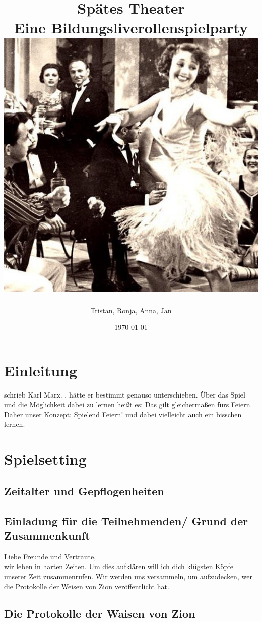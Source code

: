 \documentclass[12pt, a4paper, openany]{report}
\title{
  {\textbf{Spätes Theater}}\\
  {\large{Eine Bildungsliverollenspielparty}}\\
  \bigskip
  \bigskip
  \includegraphics[scale=0.5]{titelbild.jpg}
}
\author{Tristan, Ronja, Anna, Jan}
\date{\today}
\begin{document}
\maketitle
\frontmatter
\tableofcontents
\mainmatter

\chapter{Einleitung}
 schrieb Karl Marx. 
, hätte er bestimmt genauso unterschieben. 
Über das Spiel und die Möglichkeit dabei zu lernen heißt es:
Das gilt gleichermaßen fürs Feiern. 
Daher unser Konzept: 
Spielend Feiern! und dabei vielleicht auch ein bisschen lernen.

\chapter{Spielsetting}

\section{Zeitalter und Gepflogenheiten}

\section{Einladung für die Teilnehmenden/ Grund der Zusammenkunft}
Liebe Freunde und Vertraute,\\
wir leben in harten Zeiten. 
Um dies aufklären will ich dich klügsten Köpfe unserer Zeit zusammenrufen. 
Wir werden uns versammeln, um aufzudecken, wer die Protokolle der Weisen von Zion veröffentlicht hat. 

\section{Die Protokolle der Waisen von Zion}
\end{document}
